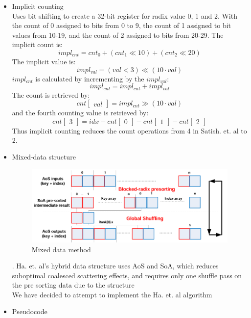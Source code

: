 \documentclass{article}
\begin{document}
\begin{itemize}
\item Implicit counting \\
Uses bit shifting to create a 32-bit register for radix value 0, 1 and 2. With the count of 0 assigned to bits from 0 to 9, the count of 1 assigned to bit values from 10-19, and the count of 2 assigned to bits from 20-29. The implicit count is: $$impl_{cnt} = cnt_0 + (cnt_1 \ll 10) + (cnt_2 \ll 20)$$
The implicit value is: 
$$impl_{val} = (val \lt  3) \ll (10 \cdot val)$$
$impl_{cnt}$ is calculated by incrementing by the $impl_{val}$:
$$impl_{cnt} = impl_{cnt} + impl_{val}$$
The count is retrieved by: 
$$cnt\begin{bmatrix}val\end{bmatrix} = impl_{cnt} \gg (10 \cdot val) $$
and the fourth counting value is retrieved by:
$$cnt\begin{bmatrix} 3 \end{bmatrix} = idx - cnt\begin{bmatrix} 0 \end{bmatrix} - cnt\begin{bmatrix} 1 \end{bmatrix} - cnt\begin{bmatrix} 2 \end{bmatrix}$$
Thus implicit counting reduces the count operations from 4 in Satish. et. al to 2. 
\item Mixed-data structure \\

\begin{figure} [H]
    \centering
    \includegraphics[width=\linewidth]{images/mixed-data.PNG}
    \caption{Mixed data method \citep{ha2010implicit}}
    \label{fig:enter-label}
\end{figure}.
Ha. et. al's hybrid data structure uses AoS and SoA, which reduces suboptimal coalesced scattering effects, and requires only one shuffle pass on the pre sorting data due to the structure \citep{ha2010implicit} 
\\
We have decided to attempt to implement the Ha. et. al algorithm
\item Pseudocode



\end{itemize}
\end{document}
